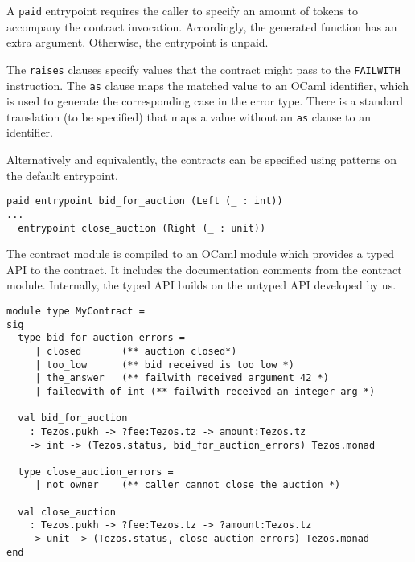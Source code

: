 \documentclass[a4paper]{llncs}
\begin{document}
A \lstinline/paid/ entrypoint requires the caller to specify an amount of tokens to
accompany the contract invocation. Accordingly, the generated function has an extra
argument. Otherwise, the entrypoint is unpaid. 

The \lstinline/raises/ clauses specify values that the contract might
pass to the \texttt{FAILWITH} instruction. The \lstinline/as/ clause
maps the matched value to an OCaml identifier, which is used to
generate the corresponding case in the error type. There is a standard
translation (to be specified) that maps a value without an
\lstinline/as/ clause to an identifier.

Alternatively and equivalently, the contracts can be specified using
patterns on the default entrypoint.

\begin{lstlisting}[caption={Alternative syntax for entrypoints},label={lst:alternative-syntax}]
  paid entrypoint bid_for_auction (Left (_ : int))
...
  entrypoint close_auction (Right (_ : unit))
\end{lstlisting}

The contract module is compiled to an OCaml module which provides a typed API to the
contract. It includes the documentation comments from the contract
module. Internally, the typed API builds on the untyped API developed
by us. 

\begin{lstlisting}[caption={Generated signature},label={lst:generated-signature}]
module type MyContract =
sig
  type bid_for_auction_errors = 
     | closed       (** auction closed*)
     | too_low      (** bid received is too low *)
     | the_answer   (** failwith received argument 42 *)
     | failedwith of int (** failwith received an integer arg *)

  val bid_for_auction
    : Tezos.pukh -> ?fee:Tezos.tz -> amount:Tezos.tz
    -> int -> (Tezos.status, bid_for_auction_errors) Tezos.monad

  type close_auction_errors = 
     | not_owner    (** caller cannot close the auction *)

  val close_auction
    : Tezos.pukh -> ?fee:Tezos.tz -> ?amount:Tezos.tz
    -> unit -> (Tezos.status, close_auction_errors) Tezos.monad
end
\end{lstlisting}
\end{document}
